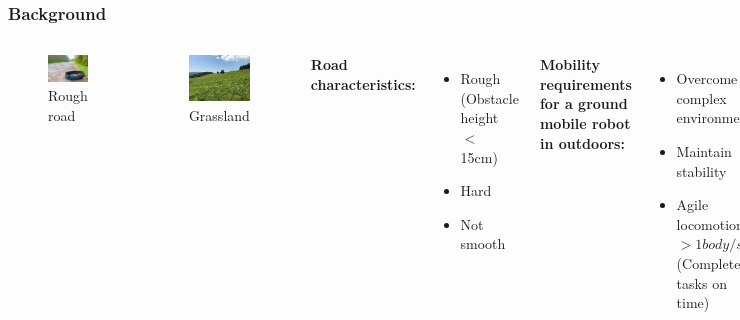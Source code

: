 \begin{frame} %
\frametitle{Background}
\begin{columns}
\begin{figure}
    \centering
    \includegraphics[width=4.6cm]{photos/rough-terrain.jpg} 
    \vspace{-0.3cm}
    \caption{Rough road}
    \label{fig:rough-terrain}
    \vspace{-0.7cm}
\end{figure}

\begin{figure}
    \centering
    \includegraphics[width=4.6cm]{photos/草地.png}
    \vspace{-0.3cm}
    \caption{Grassland}
    \label{fig:grass-road}
\end{figure}

\textbf{Road characteristics:}
\begin{itemize}
    \item Rough \\(Obstacle height $<$ 15cm)
    \item Hard
    \item Not smooth
\end{itemize}
\textbf{Mobility requirements for a ground mobile robot in outdoors:}
\begin{itemize}
    \item Overcome complex environments
    \item Maintain stability
    \item Agile locomotion ($>1 body/s$) \\(Complete tasks on time)
\end{itemize}
\end{columns}
\end{frame}